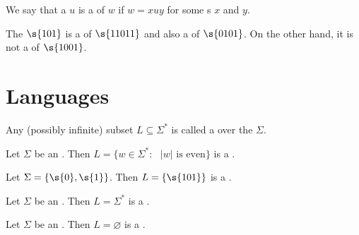 \begin{flex}
\begin{definition}[Substring] \label{definition:Substring}
We say that a  $u$ is a  of  $w$ if $w = xuy$ for some s $x$ and $y$.
\end{definition}

\begin{example}[$101$ as a substring] \label{example:101-as-a-substring}
The  $\s{101}$ is a  of $\s{11011}$ and also a  of $\s{0101}$. 
On the other hand, it is not a  of $\s{1001}$.
\end{example}
\end{flex}




\section{Languages}
\label{section:Languages}


\begin{flex}
\begin{definition}[Language] \label{definition:Language}
Any (possibly infinite) subset $L \subseteq \Sigma^*$ is called a  over the  $\Sigma$.
\end{definition}

\begin{example} \label{example:Language-of-even-length-strings}
Let $\Sigma$ be an .
Then $L = \{w \in \Sigma^* : \text{ $|w|$ is even}\}$ is a .
\end{example}

\begin{example} \label{example:A-language-with-one-word}
Let $\Sigma = \{\s{0},\s{1}\}$.
Then $L = \{\s{101}\}$ is a .
\end{example}

\begin{example} \label{example:Sigma-as-a-language}
Let $\Sigma$ be an .
Then $L = \Sigma^*$ is a .
\end{example}

\begin{example} \label{example:Empty-set-as-a-language}
Let $\Sigma$ be an .
Then $L = \varnothing$ is a .
\end{example}
\end{flex}


